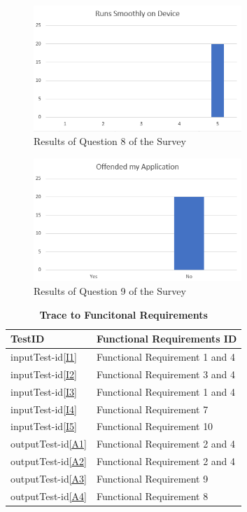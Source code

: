 \documentclass[12pt, titlepage]{article}
\begin{document}
\begin{figure}[h]
\centering
\includegraphics[width=0.7\textwidth]{Question8.png}
\caption{Results of Question 8 of the Survey}
\label{Q8}
\end{figure}

\begin{figure}[h]
\centering
\includegraphics[width=0.7\textwidth]{Question9.png}
\caption{Results of Question 9 of the Survey}
\label{Q9}
\end{figure}

\begin{table}[ht]
\caption{\bf Trace to Funcitonal Requirements}
\label{TraceFR}
\begin{tabularx}{\textwidth}{p{5cm}p{8cm}}
\toprule {\bf TestID} & {\bf Functional Requirements ID}\\
\midrule
inputTest-id\ref{I1} & Functional Requirement 1 and 4\\
inputTest-id\ref{I2} & Functional Requirement 3 and 4\\
inputTest-id\ref{I3} & Functional Requirement 1 and 4\\
inputTest-id\ref{I4} & Functional Requirement 7\\
inputTest-id\ref{I5} & Functional Requirement 10\\
outputTest-id\ref{A1} & Functional Requirement 2 and 4\\
outputTest-id\ref{A2} & Functional Requirement 2 and 4 \\
outputTest-id\ref{A3} & Functional Requirement 9\\
outputTest-id\ref{A4} & Functional Requirement 8\\
\bottomrule
\end{tabularx}
\end{table}
\end{document}
